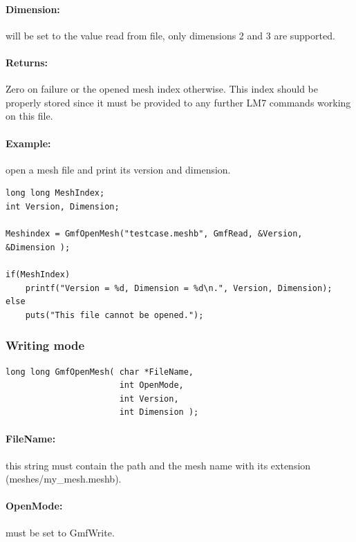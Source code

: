 \documentclass[a4paper,12pt]{article}
\begin{document}
\paragraph{Dimension:}
will be set to the value read from file, only dimensions 2 and 3 are supported.

\paragraph{Returns:}
Zero on failure or the opened mesh index otherwise. This index should be properly stored since it must be provided to any further LM7 commands working on this file.

\paragraph{Example:} open a mesh file and print its version and dimension.

\begin{tt}
\begin{verbatim}
long long MeshIndex;
int Version, Dimension;

Meshindex = GmfOpenMesh("testcase.meshb", GmfRead, &Version, &Dimension );

if(MeshIndex)
    printf("Version = %d, Dimension = %d\n.", Version, Dimension);
else
    puts("This file cannot be opened.");
\end{verbatim}
\end{tt}
\normalfont


\subsubsection{Writing mode}
\begin{tt}
\begin{verbatim}
long long GmfOpenMesh( char *FileName,
                       int OpenMode,
                       int Version,
                       int Dimension );
\end{verbatim}
\end{tt}
\normalfont

\paragraph{FileName:}
this string must contain the path and the mesh name with its extension (meshes/my\_mesh.meshb).

\paragraph{OpenMode:}
must be set to GmfWrite.
\end{document}

